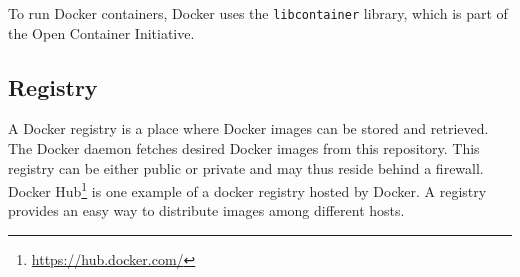 To run Docker containers, Docker uses the \verb|libcontainer| library, which is part of the Open Container Initiative.

\subsection{Registry}
A Docker registry is a place where Docker images can be stored and retrieved. The Docker daemon
fetches desired Docker images from this repository. This registry can be either public or private and may thus reside behind a firewall. Docker
Hub\footnote{\url{https://hub.docker.com/}} is one example of a docker registry
hosted by Docker. A registry provides an easy way to distribute images among different hosts.
